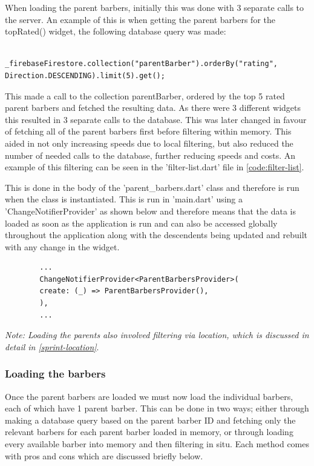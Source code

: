 \documentclass[12pt]{article}
\begin{document}
	When loading the parent barbers, initially this was done with 3 separate calls to the server. An example of this is when getting the parent barbers for the topRated() widget, the following database query was made: 
	\begin{lstlisting}
		_firebaseFirestore.collection("parentBarber").orderBy("rating", Direction.DESCENDING).limit(5).get();
	\end{lstlisting}
	This made a call to the collection parentBarber, ordered by the top 5 rated parent barbers and fetched the resulting data. As there were 3 different widgets this resulted in 3 separate calls to the database. This was later changed in favour of fetching all of the parent barbers first before filtering within memory. This aided in not only increasing speeds due to local filtering, but also reduced the number of needed calls to the database, further reducing speeds and costs. An example of this filtering can be seen in the 'filter-list.dart' file in \autoref{code:filter-list}.
	\newline
	
	This is done in the body of the 'parent\_barbers.dart' class and therefore is run when the class is instantiated. This is run in 'main.dart' using a 'ChangeNotifierProvider' as shown below and therefore means that the data is loaded as soon as the application is run and can also be accessed globally throughout the application along with the descendents being updated and rebuilt with any change in the widget.
	
	\begin{verbatim}
		...
		ChangeNotifierProvider<ParentBarbersProvider>(
		create: (_) => ParentBarbersProvider(),
		),
		...
	\end{verbatim}
	
	
	\noindent
	\emph{Note: Loading the parents also involved filtering via location, which is discussed in detail in \autoref{sprint-location}}.
	
	
	\subsubsection{Loading the barbers}
	Once the parent barbers are loaded we must now load the individual barbers, each of which have 1 parent barber. This can be done in two ways; either through making a database query based on the parent barber ID and fetching only the relevant barbers for each parent barber loaded in memory, or through loading every available barber into memory and then filtering in situ. Each method comes with pros and cons which are discussed briefly below.
	\newline
	
\end{document}
